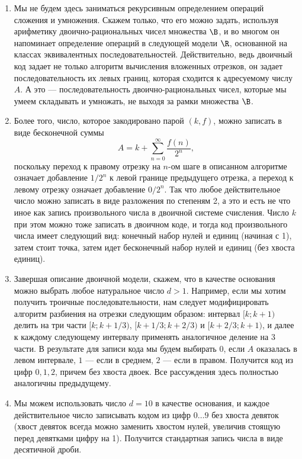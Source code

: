 \begin{enumerate}
\item Мы не будем здесь заниматься рекурсивным определением операций сложения и умножения. Скажем только, что его можно задать, используя арифметику двоично-рациональных чисел множества $\B$, и во многом он напоминает определение операций в следующей модели $\R$, основанной на классах эквивалентных последовательностей. Действительно, ведь двоичный код задает не только алгоритм вычисления вложенных отрезков, он задает последовательность их левых границ, которая сходится к адресуемому числу $A$. А это --- последовательность двоично-рациональных чисел, которые мы умеем складывать и умножать, не выходя за рамки множества $\B$.
\item Более того, число, которое закодировано парой $(k,f)$, можно записать в виде бесконечной суммы
$$
A = k+\sum_{n=0}^\infty\frac{f(n)}{2^n},
$$
поскольку переход к правому отрезку на $n$-ом шаге в описанном алгоритме означает добавление $1/2^n$ к левой границе предыдущего отрезка, а переход к левому отрезку означает добавление $0/2^n$. Так что любое действительное число можно записать в виде разложения по степеням 2, а это и есть не что иное как запись произвольного числа в двоичной системе счисления. Число $k$ при этом можно тоже записать в двоичном коде, и тогда код произвольного числа имеет следующий вид: конечный набор нулей и единиц (начиная с 1), затем стоит точка, затем идет бесконечный набор нулей и единиц (без хвоста единиц).
\item Завершая описание двоичной модели, скажем, что в качестве основания можно выбрать любое натуральное число $d>1$. Например, если мы хотим получить троичные последовательности, нам следует модифицировать алгоритм разбиения на отрезки следующим образом: интервал $[k;k+1)$ делить на три части $[k;k+1/3)$, $[k+1/3;k+2/3)$ и $[k+2/3;k+1)$, и далее к каждому следующему интервалу применять аналогичное деление на 3 части. В результате для записи кода мы будем выбирать $0$, если $A$ оказалась в левом интервале, $1$ --- если в среднем, $2$ --- если в правом. Получится код из цифр $0,1,2$, причем без хвоста двоек. Все рассуждения здесь полностью аналогичны предыдущему.
\item Мы можем использовать число $d=10$ в качестве основания, и каждое действительное число записывать кодом из цифр $0\dots 9$ без хвоста девяток (хвост девяток всегда можно заменить хвостом нулей, увеличив стоящую перед девятками цифру на 1). Получится стандартная запись числа в виде десятичной дроби.





\end{enumerate}
